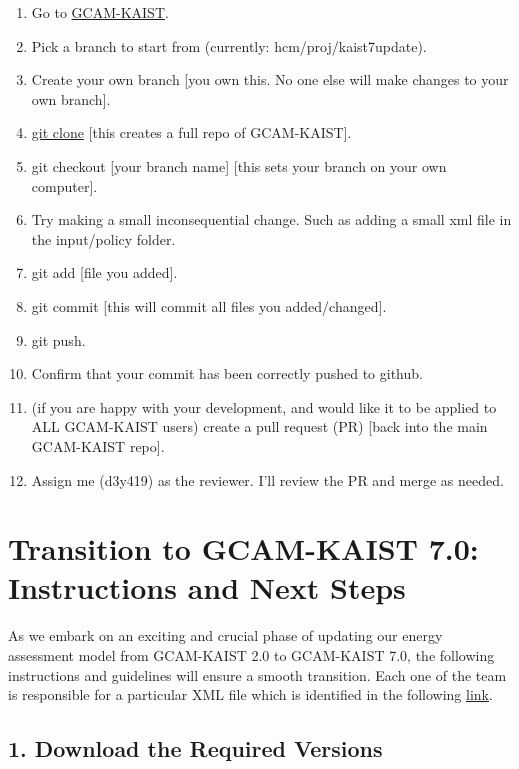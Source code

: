\documentclass[
  letterpaper,
  DIV=11,
  numbers=noendperiod]{scrartcl}
\begin{document}
\begin{enumerate}
\def\labelenumi{\arabic{enumi}.}
\item
  Go to \href{https://github.com/GCAM-KAIST/gcam-core}{GCAM-KAIST}.
\item
  Pick a branch to start from (currently: hcm/proj/kaist7update).
\item
  Create your own branch {[}you own this. No one else will make changes
  to your own branch{]}.
\item
  \href{https://github.com/GCAM-KAIST/gcam-core.git}{git clone} {[}this
  creates a full repo of GCAM-KAIST{]}.
\item
  git checkout {[}your branch name{]} {[}this sets your branch on your
  own computer{]}.
\item
  Try making a small inconsequential change. Such as adding a small xml
  file in the input/policy folder.
\item
  git add {[}file you added{]}.
\item
  git commit {[}this will commit all files you added/changed{]}.
\item
  git push.
\item
  Confirm that your commit has been correctly pushed to github.
\item
  (if you are happy with your development, and would like it to be
  applied to ALL GCAM-KAIST users) create a pull request (PR) {[}back
  into the main GCAM-KAIST repo{]}.
\item
  Assign me (d3y419) as the reviewer. I'll review the PR and merge as
  needed.
\end{enumerate}

\hypertarget{transition-to-gcam-kaist-7.0-instructions-and-next-steps}{%
\section{Transition to GCAM-KAIST 7.0: Instructions and Next
Steps}\label{transition-to-gcam-kaist-7.0-instructions-and-next-steps}}

As we embark on an exciting and crucial phase of updating our energy
assessment model from GCAM-KAIST 2.0 to GCAM-KAIST 7.0, the following
instructions and guidelines will ensure a smooth transition. Each one of
the team is responsible for a particular XML file which is identified in
the following \href{gcam-kaist-upgrade7b.xlsx}{link}.

\hypertarget{download-the-required-versions}{%
\subsection{1. Download the Required
Versions}\label{download-the-required-versions}}
\end{document}
